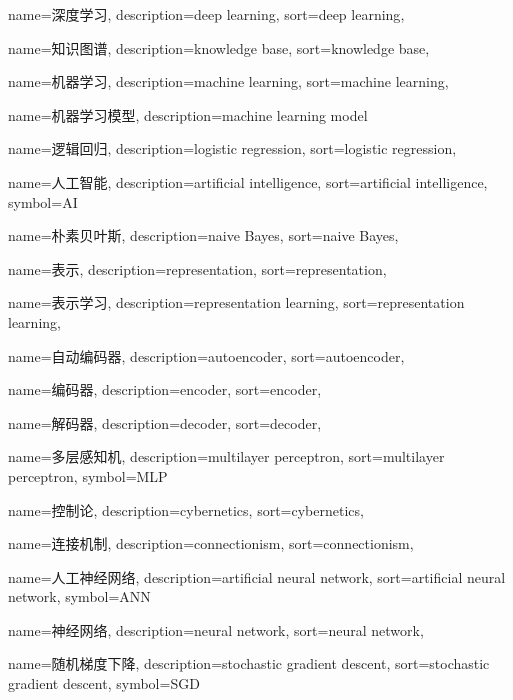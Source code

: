 {
  name=深度学习,
  description={deep learning},
  sort={deep learning},
}

{
  name=知识图谱,
  description={knowledge base},
  sort={knowledge base},
}

{
  name=机器学习,
  description={machine learning},
  sort={machine learning},
}

{
  name=机器学习模型,
  description={machine learning model}
}

{
  name=逻辑回归,
  description={logistic regression},
  sort={logistic regression},
}

{
  name=人工智能,
  description={artificial intelligence},
  sort={artificial intelligence},
  symbol={AI}
}

{
  name=朴素贝叶斯,
  description={naive Bayes},
  sort={naive Bayes},
}

{
  name=表示,
  description={representation},
  sort={representation},
}

{
  name=表示学习,
  description={representation learning},
  sort={representation learning},
}

{
  name=自动编码器,
  description={autoencoder},
  sort={autoencoder},
}

{
  name=编码器,
  description={encoder},
  sort={encoder},
}

{
  name=解码器,
  description={decoder},
  sort={decoder},
}

{
  name=多层感知机,
  description={multilayer perceptron},
  sort={multilayer perceptron},
  symbol={MLP}
}

{
  name=控制论,
  description={cybernetics},
  sort={cybernetics},
}

{
  name=连接机制,
  description={connectionism},
  sort={connectionism},
}

{
  name=人工神经网络,
  description={artificial neural network},
  sort={artificial neural network},
  symbol={ANN}
}

{
  name=神经网络,
  description={neural network},
  sort={neural network},
}

{
  name=随机梯度下降,
  description={stochastic gradient descent},
  sort={stochastic gradient descent},
  symbol={SGD}
}

